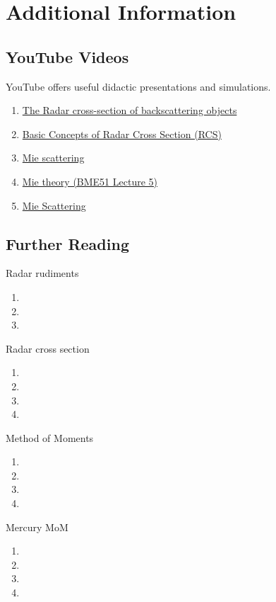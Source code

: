 % 

\section{Additional Information}

\subsection{YouTube Videos}
YouTube offers useful didactic presentations and simulations.
\begin{enumerate}
	\item \href{https://www.youtube.com/watch?v=ujyoJSzwmQw}{The Radar cross-section of backscattering objects}
	\item \href{https://www.youtube.com/watch?v=0g5x4pXBid8}{Basic Concepts of Radar Cross Section (RCS)}
	\item \href{https://www.youtube.com/watch?v=mM-QDN68ebc}{Mie scattering}
	\item \href{https://www.youtube.com/watch?v=ayI6W6-ypUM&list=PLzD7pNQo-MGzkBnp1HVTGXaIQzWvkJ0M8}{Mie theory (BME51 Lecture 5)}
	\item \href{https://www.youtube.com/shorts/ggMoo8wH1_o}{Mie Scattering}
\end{enumerate}

\subsection{Further Reading}
Radar rudiments
\begin{enumerate}
	\item {}
	\item {}
	\item {}
\end{enumerate}
Radar cross section
\begin{enumerate}
	\item {}
	\item {}
	\item {}
	\item {}
\end{enumerate}
Method of Moments
\begin{enumerate}
	\item {}
	\item {}
	\item {}
	\item {}
\end{enumerate}
Mercury MoM
\begin{enumerate}
	\item {}
	\item {}
	\item {}
	\item {}
\end{enumerate}

\endinput  %